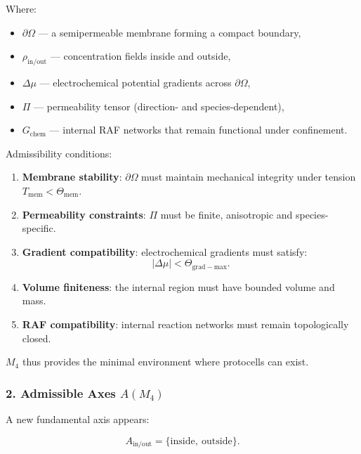 Where:

\begin{itemize}
    \item $\partial\Omega$ — a semipermeable membrane forming a compact boundary,
    \item $\rho_{\mathrm{in/out}}$ — concentration fields inside and outside,
    \item $\Delta\mu$ — electrochemical potential gradients across $\partial\Omega$,
    \item $\Pi$ — permeability tensor (direction- and species-dependent),
    \item $G_{\mathrm{chem}}$ — internal RAF networks that remain functional
          under confinement.
\end{itemize}

Admissibility conditions:

\begin{enumerate}
    \item \textbf{Membrane stability}:
    $\partial\Omega$ must maintain mechanical integrity under tension
    $T_{\mathrm{mem}} < \Theta_{\mathrm{mem}}$.

    \item \textbf{Permeability constraints}:
    $\Pi$ must be finite, anisotropic and species-specific.

    \item \textbf{Gradient compatibility}:
    electrochemical gradients must satisfy:
    \[
    |\Delta\mu| < \Theta_{\mathrm{grad-max}}.
    \]

    \item \textbf{Volume finiteness}:
    the internal region must have bounded volume and mass.

    \item \textbf{RAF compatibility}:
    internal reaction networks must remain topologically closed.
\end{enumerate}

$M_4$ thus provides the minimal environment where protocells can exist.

\subsubsection*{2. Admissible Axes \texorpdfstring{$A(M_4)$}{A(M_4)}}

A new fundamental axis appears:

\[
A_{\mathrm{in/out}} = \{ \text{inside},\ \text{outside} \}.
\]

